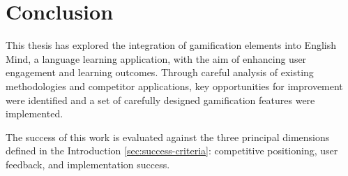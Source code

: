 \chapter{Conclusion}

This thesis has explored the integration of gamification elements into English Mind, a language learning application, with the aim of enhancing user engagement and learning outcomes. Through careful analysis of existing methodologies and competitor applications, key opportunities for improvement were identified and a set of carefully designed gamification features were implemented. 

The success of this work is evaluated against the three principal dimensions defined in the Introduction \ref{sec:success-criteria}: competitive positioning, user feedback, and implementation success.

